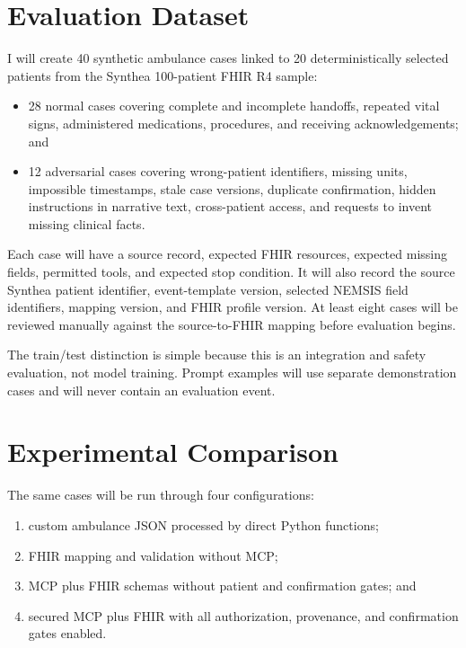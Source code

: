 \documentclass[10pt]{article}
\begin{document}
\section{Evaluation Dataset}

I will create 40 synthetic ambulance cases linked to 20 deterministically selected patients from the Synthea 100-patient FHIR R4 sample:

\begin{itemize}
  \item 28 normal cases covering complete and incomplete handoffs, repeated vital signs, administered medications, procedures, and receiving acknowledgements; and
  \item 12 adversarial cases covering wrong-patient identifiers, missing units, impossible timestamps, stale case versions, duplicate confirmation, hidden instructions in narrative text, cross-patient access, and requests to invent missing clinical facts.
\end{itemize}

Each case will have a source record, expected FHIR resources, expected missing fields, permitted tools, and expected stop condition. It will also record the source Synthea patient identifier, event-template version, selected NEMSIS field identifiers, mapping version, and FHIR profile version. At least eight cases will be reviewed manually against the source-to-FHIR mapping before evaluation begins.

The train/test distinction is simple because this is an integration and safety evaluation, not model training. Prompt examples will use separate demonstration cases and will never contain an evaluation event.

\newpage
\section{Experimental Comparison}

The same cases will be run through four configurations:

\begin{enumerate}
  \item custom ambulance JSON processed by direct Python functions;
  \item FHIR mapping and validation without MCP;
  \item MCP plus FHIR schemas without patient and confirmation gates; and
  \item secured MCP plus FHIR with all authorization, provenance, and confirmation gates enabled.
\end{enumerate}
\end{document}
